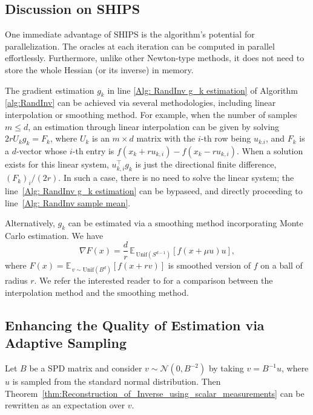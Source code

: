 \subsection{Discussion on SHIPS}
One immediate advantage of SHIPS is the algorithm's potential for parallelization. The oracles at each iteration can be computed in parallel effortlessly. Furthermore, unlike other Newton-type methods, it does not need to store the whole Hessian (or its inverse) in memory.

The gradient estimation $g_k$ in line \ref{Alg: RandInv g_k estimation} of Algorithm \ref{alg:RandInv} can be achieved via several methodologies, including linear interpolation or smoothing method. 
For example, when the number of samples $m \leq d$, an estimation through linear interpolation can be given by solving
$2r U_k g_k = F_k$,
where $U_k$ is an $m\times d$ matrix with the $i$-th row being $u_{k.i}$, and $F_k$ is a $d$-vector whose $i$-th entry is $f(x_k + r u_{k,i}) - f(x_k - r u_{k,i})$.
When a solution exists for this linear system, $u_{k,i}^{\top}g_k$ is just the directional finite difference, $(F_k)_i / (2r)$. 
In such a case, there is no need to solve the linear system; the line~\ref{Alg: RandInv g_k estimation} can be bypaseed, and directly proceeding to line~\ref{Alg: RandInv sample mean}.

Alternatively, $g_k$ can be estimated via a smoothing method incorporating Monte Carlo estimation. We have \cite{berahas2021theoretical}
\[\nabla F(x) = \frac{d}{r} \, \mathbb{E}_{\,\mathrm{Unif}(S^{d-1})}[ f(x+\mu u) u ], \]
where $F(x) = \mathbb{E}_{\,v\sim \mathrm{Unif}(B^d)}[f(x+r v)]$ is smoothed version of $f$ on a ball of radius $r$.
We refer the interested reader to \cite{berahas2021theoretical} for a comparison between the interpolation method and the smoothing method.

\subsection{Enhancing the Quality of Estimation via Adaptive Sampling}
Let $B$ be a SPD matrix and consider $v \sim \mathcal{N}(0,B^{-2})$ by taking $v = B^{-1} u$, where $u$ is sampled from the standard normal distribution. Then Theorem~\ref{thm:Reconstruction_of_Inverse_using_scalar_measurements} can be rewritten as an expectation over $v$.

